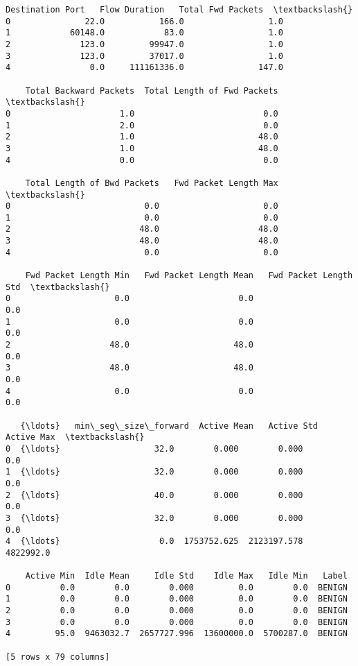 \documentclass[11pt]{article}
\makeatletter
\newcommand{\boxspacing}{\kern\kvtcb@left@rule\kern\kvtcb@boxsep}
\newcommand{\prompt}[4]{
        {\ttfamily\llap{{\color{#2}[#3]:\hspace{3pt}#4}}\vspace{-\baselineskip}}
    }
\makeatother
\begin{document}
            \begin{tcolorbox}[breakable, size=fbox, boxrule=.5pt, pad at break*=1mm, opacityfill=0]
\prompt{Out}{outcolor}{1}{\boxspacing}
\begin{Verbatim}[commandchars=\\\{\}]
    Destination Port   Flow Duration   Total Fwd Packets  \textbackslash{}
0               22.0           166.0                 1.0
1            60148.0            83.0                 1.0
2              123.0         99947.0                 1.0
3              123.0         37017.0                 1.0
4                0.0     111161336.0               147.0

    Total Backward Packets  Total Length of Fwd Packets  \textbackslash{}
0                      1.0                          0.0
1                      2.0                          0.0
2                      1.0                         48.0
3                      1.0                         48.0
4                      0.0                          0.0

    Total Length of Bwd Packets   Fwd Packet Length Max  \textbackslash{}
0                           0.0                     0.0
1                           0.0                     0.0
2                          48.0                    48.0
3                          48.0                    48.0
4                           0.0                     0.0

    Fwd Packet Length Min   Fwd Packet Length Mean   Fwd Packet Length Std  \textbackslash{}
0                     0.0                      0.0                     0.0
1                     0.0                      0.0                     0.0
2                    48.0                     48.0                     0.0
3                    48.0                     48.0                     0.0
4                     0.0                      0.0                     0.0

   {\ldots}   min\_seg\_size\_forward  Active Mean   Active Std   Active Max  \textbackslash{}
0  {\ldots}                   32.0        0.000        0.000          0.0
1  {\ldots}                   32.0        0.000        0.000          0.0
2  {\ldots}                   40.0        0.000        0.000          0.0
3  {\ldots}                   32.0        0.000        0.000          0.0
4  {\ldots}                    0.0  1753752.625  2123197.578    4822992.0

    Active Min  Idle Mean     Idle Std    Idle Max   Idle Min   Label
0          0.0        0.0        0.000         0.0        0.0  BENIGN
1          0.0        0.0        0.000         0.0        0.0  BENIGN
2          0.0        0.0        0.000         0.0        0.0  BENIGN
3          0.0        0.0        0.000         0.0        0.0  BENIGN
4         95.0  9463032.7  2657727.996  13600000.0  5700287.0  BENIGN

[5 rows x 79 columns]
\end{Verbatim}
\end{tcolorbox}
        
\end{document}
